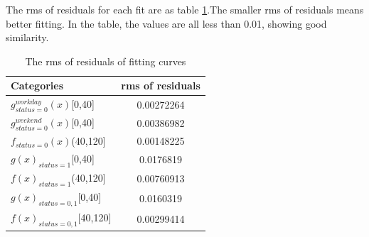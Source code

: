 The rms of residuals for each fit are as table \ref{table_rms}.The smaller rms of residuals means better fitting. In the table, the values are all less than 0.01, showing good similarity.

\begin{table}
\caption{The rms of residuals of fitting curves}\label{table_rms}
\centering
\begin{tabular}{l|c}
  \hline
  Categories & rms of residuals  \\
  \hline
  $g_{status=0}^{workday}(x)$[0,40] & 0.00272264\\
  $g_{status=0}^{weekend}(x)$[0,40] & 0.00386982  \\
  $f_{status=0}(x)$(40,120] & 0.00148225\\
  $g(x)_{status=1}$[0,40]& 0.0176819 \\
  $f(x)_{status=1}$(40,120] & 0.00760913\\
  $g(x)_{status=0,1}$[0,40]& 0.0160319\\
  $f(x)_{status=0,1}$[40,120]& 0.00299414\\
  \hline
\end{tabular}
\end{table}

